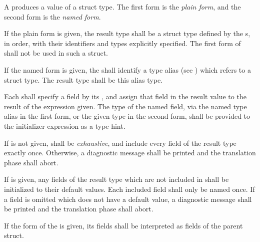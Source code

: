 \specsubsubitem
A  produces a value of a struct type. The first
form is the \textit{plain form}, and the second form is the \textit{named form}.

\specsubsubitem
If the plain form is given, the result type shall be a struct type defined by
the s, in order, with their identifiers and types
explicitly specified. The first form of  shall not be
used in such a struct.

\specsubsubitem
If the named form is given, the  shall identify a type
alias (see ) which refers to a struct type. The result
type shall be this alias type.

\specsubsubitem
Each  shall specify a field by its ,
and assign that field in the result value to the result of the expression
given. The type of the named field, via the named type alias in the first form,
or the given type in the second form, shall be provided to the initializer
expression as a type hint.

\specsubsubitem
If  is not given,  shall be
\textit{exhaustive}, and include every field of the result type exactly once.
Otherwise, a diagnostic message shall be printed and the translation phase
shall abort.

\specsubsubitem
If  is given, any fields of the result type which are not
included in  shall be initialized to their default
values. Each included field shall only be named once. If a field is omitted
which does not have a default value, a diagnostic message shall be printed and
the translation phase shall abort.

\specsubsubitem
If the  form of the  is
given, its fields shall be interpreted as fields of the parent struct.



